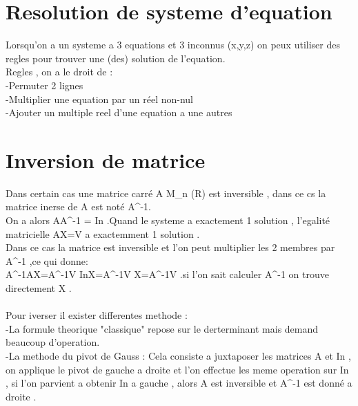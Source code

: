 \documentclass[a4paper,8pt,openany]{book}
\begin{document}
\chapter{Resolution de systeme d'equation}
Lorsqu'on a un systeme a 3 equations et 3 inconnus (x,y,z) on peux utiliser des regles pour trouver une (des) solution de l'equation.\\
Regles , on a le droit de : \\
-Permuter 2 lignes\\
-Multiplier une equation par un réel non-nul\\
-Ajouter un multiple reel d'une equation a une autres\\


\chapter{Inversion de matrice}
Dans certain cas une matrice carré A \in M_n (R) est inversible , dans ce cs la matrice inerse de A est noté A^{-1}.\\
On a alors A\times A^{-1} = In .Quand le systeme a exactement 1 solution , l'egalité matricielle AX=V a exactemment 1 solution .\\
Dans ce cas la matrice est inversible et l'on peut multiplier les 2 membres par A^{-1} ,ce qui donne:\\
A^{-1}AX=A^{-1}V \Rightarrow InX=A^{-1}V \Rightarrow X=A^{-1}V .si l'on sait calculer A^{-1} on trouve directement X .\\
\\
Pour iverser il exister differentes methode :\\
-La formule theorique "classique" repose sur le derterminant mais demand beaucoup d'operation.\\
-La methode du pivot de Gauss : Cela consiste a juxtaposer les matrices A et In , on applique le pivot de gauche a droite et l'on effectue les meme operation sur In , si l'on parvient a obtenir In a gauche , alors A est inversible et A^{-1} est donné a droite .

\end{document}
